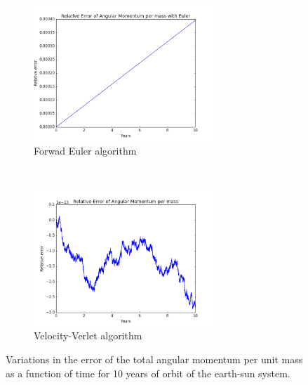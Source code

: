 \documentclass[a4paper, 10pt]{article}
\begin{document}
\begin{figure}[t!]
    \centering
    \begin{subfigure}[t]{0.5\textwidth}
        \centering
        \includegraphics[height=2.0in]{relErrMomESEuler.png}
        \caption{Forwad Euler algorithm}
    \end{subfigure}%
    ~ 
    \begin{subfigure}[t]{0.5\textwidth}
        \centering
        \includegraphics[height=2.0in]{relErMomES.png}
        \caption{Velocity-Verlet algorithm}
    \end{subfigure}
    \caption{Variations in the error of the total angular momentum per unit mass as a function of time for 10 years of orbit of the earth-sun system. }
\end{figure}
\end{document}
